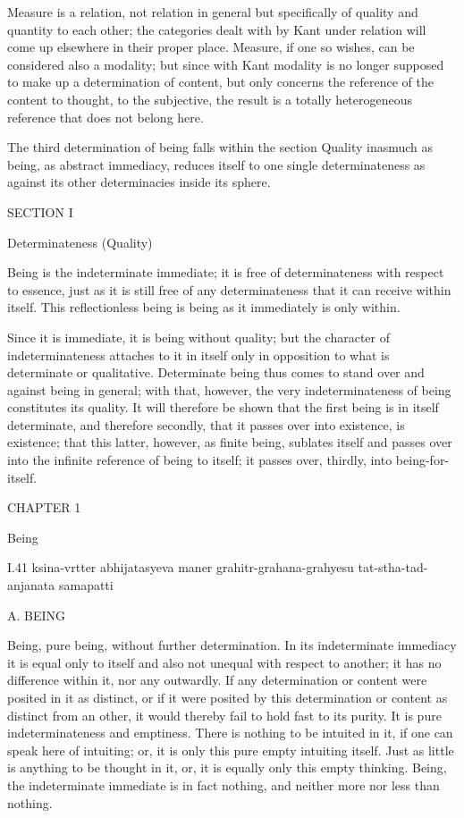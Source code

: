 Measure is a relation, not relation in general
but specifically of quality and quantity to each other;
the categories dealt with by Kant under relation
will come up elsewhere in their proper place.
Measure, if one so wishes, can be considered also a modality;
but since with Kant modality is no longer
supposed to make up a determination of content,
but only concerns the reference of the content
to thought, to the subjective,
the result is a totally heterogeneous reference
that does not belong here.

The third determination of being falls within
the section Quality inasmuch as being, as abstract immediacy,
reduces itself to one single determinateness
as against its other determinacies inside its sphere.

SECTION I

Determinateness (Quality)

Being is the indeterminate immediate;
it is free of determinateness with respect to essence,
just as it is still free of any determinateness
that it can receive within itself.
This reflectionless being is being
as it immediately is only within.

Since it is immediate, it is being without quality;
but the character of indeterminateness attaches to it in itself
only in opposition to what is determinate or qualitative.
Determinate being thus comes to stand over and against being in general;
with that, however, the very indeterminateness of being
constitutes its quality.
It will therefore be shown that the first being is
in itself determinate, and therefore secondly,
that it passes over into existence, is existence;
that this latter, however, as finite being, sublates itself
and passes over into the infinite reference of being to itself;
it passes over, thirdly, into being-for-itself.

CHAPTER 1

Being

I.41
ksina-vrtter abhijatasyeva maner
grahitr-grahana-grahyesu tat-stha-tad-anjanata samapatti

A. BEING

Being, pure being, without further determination.
In its indeterminate immediacy it is equal only to itself
and also not unequal with respect to another;
it has no difference within it, nor any outwardly.
If any determination or content were posited in it as distinct,
or if it were posited by this determination or content
as distinct from an other,
it would thereby fail to hold fast to its purity.
It is pure indeterminateness and emptiness.
There is nothing to be intuited in it,
if one can speak here of intuiting;
or, it is only this pure empty intuiting itself.
Just as little is anything to be thought in it,
or, it is equally only this empty thinking.
Being, the indeterminate immediate is in fact nothing,
and neither more nor less than nothing.

